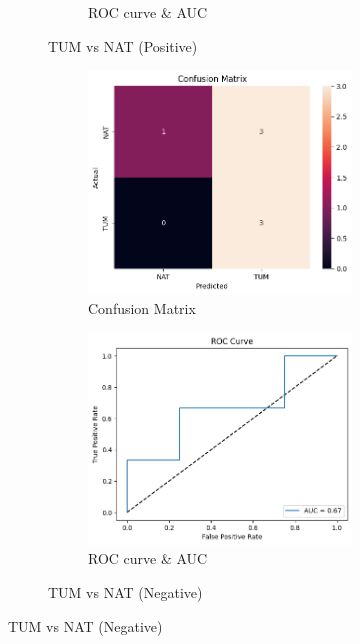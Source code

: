 \documentclass[a4paper,12pt]{article}
\begin{document}
\begin{figure}[H]
\begin{subfigure}[b]{0.45\textwidth}
\begin{subfigure}[b]{0.49\textwidth}
			\caption{ROC curve \& AUC}
			\label{fig:fig2}
		\end{subfigure}
		\caption{TUM vs NAT (Positive)}
		\label{subfig:1}
	\end{subfigure}
	\hfill
	\begin{subfigure}[b]{0.45\textwidth}
		\centering
		\begin{subfigure}[b]{0.49\textwidth}
			\centering
			\includegraphics[width=\textwidth]{images/2lnc.png}  %
			\caption{Confusion Matrix}
			\label{fig:fig3}
		\end{subfigure}
		\hfill
		\begin{subfigure}[b]{0.49\textwidth}
			\centering
			\includegraphics[width=\textwidth]{images/2lnr.png}  %
			\caption{ROC curve \& AUC}
			\label{fig:fig4}
		\end{subfigure}
		\caption{TUM vs NAT (Negative)}
		\label{subfig:2}
	\end{subfigure}


\end{figure}
\end{document}
